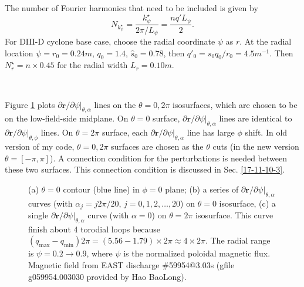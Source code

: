 \documentclass{llncs}
\newcommand{\nobracket}{}
\begin{document}
The number of Fourier harmonics that need to be included is given by
\begin{equation}
  N_{k_{\psi}^{\star}} = \frac{k_{\psi}^{\star}}{2 \pi / L_{\psi}} = \frac{n
  q' L_{\psi}}{2} .
\end{equation}
For DIII-D cyclone base case, choose the radial coordinate $\psi$ as $r$. At
the radial location $\psi = r_0 = 0.24 m$, $q_0 = 1.4$, $\hat{s}_0 = 0.78$,
then $q'_0 = s_0 q_0 / r_0 = 4.5 m^{- 1}$. Then $N_r^{\star} = n \times 0.45$
for the radial width $L_r = 0.10 m$.

\

Figure \ref{17-11-10-1} plots $\partial \mathbf{r}/ \partial \psi |
\nobracket_{\theta, \alpha}$ lines on the $\theta = 0, 2 \pi$ isosurfaces,
which are chosen to be on the low-field-side midplane. On $\theta = 0$
surface, $\partial \mathbf{r}/ \partial \psi |_{\theta, \alpha} \nobracket$
lines are identical to $\partial \mathbf{r}/ \partial \psi |_{\theta, \phi}
\nobracket$ lines. On $\theta = 2 \pi$ surface, each $\partial \mathbf{r}/
\partial \psi |_{\theta, \alpha} \nobracket$ line has large $\phi$ shift. In
old version of my code, $\theta = 0, 2 \pi$ surfaces are chosen as the
$\theta$ cuts (in the new version $\theta = [- \pi, \pi]$). A connection
condition for the perturbations is needed between these two surfaces. This
connection condition is discussed in Sec. \ref{17-11-10-3}.

\begin{figure}[h]
  
  \caption{\label{17-11-10-1}(a) $\theta = 0$ contour (blue line) in $\phi =
  0$ plane; (b) a series of $\partial \mathbf{r}/ \partial \psi |_{\theta,
  \alpha} \nobracket$ curves (with $\alpha_j = j 2 \pi / 20$, $j = 0, 1, 2,
  \ldots, 20$) on $\theta = 0$ isosurface, (c) a single $\partial \mathbf{r}/
  \partial \psi |_{\theta, \alpha} \nobracket$ curve (with $\alpha = 0$) on
  $\theta = 2 \pi$ isosurface. This curve finish about 4 torodial loops
  because $(q_{\max} - q_{\min}) 2 \pi = (5.56 - 1.79) \times 2 \pi \approx 4
  \times 2 \pi$. The radial range is $\psi = 0.2 \rightarrow 0.9$, where
  $\psi$ is the normalized poloidal magnetic flux. Magnetic field from EAST
  discharge \#59954@3.03s (gfile g059954.003030 provided by Hao BaoLong).}
\end{figure}
\end{document}

